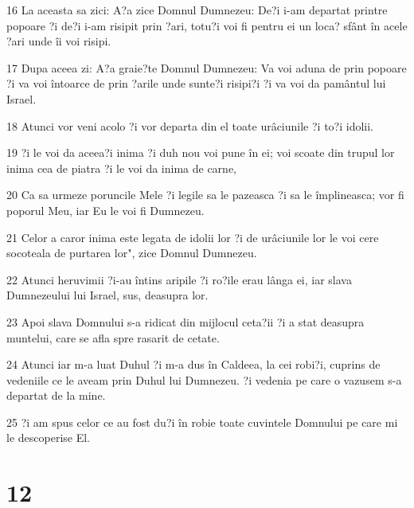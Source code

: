 \par 16 La aceasta sa zici: A?a zice Domnul Dumnezeu: De?i i-am departat printre popoare ?i de?i i-am risipit prin ?ari, totu?i voi fi pentru ei un loca? sfânt în acele ?ari unde îi voi risipi.
\par 17 Dupa aceea zi: A?a graie?te Domnul Dumnezeu: Va voi aduna de prin popoare ?i va voi întoarce de prin ?arile unde sunte?i risipi?i ?i va voi da pamântul lui Israel.
\par 18 Atunci vor veni acolo ?i vor departa din el toate urâciunile ?i to?i idolii.
\par 19 ?i le voi da aceea?i inima ?i duh nou voi pune în ei; voi scoate din trupul lor inima cea de piatra ?i le voi da inima de carne,
\par 20 Ca sa urmeze poruncile Mele ?i legile sa le pazeasca ?i sa le împlineasca; vor fi poporul Meu, iar Eu le voi fi Dumnezeu.
\par 21 Celor a caror inima este legata de idolii lor ?i de urâciunile lor le voi cere socoteala de purtarea lor", zice Domnul Dumnezeu.
\par 22 Atunci heruvimii ?i-au întins aripile ?i ro?ile erau lânga ei, iar slava Dumnezeului lui Israel, sus, deasupra lor.
\par 23 Apoi slava Domnului s-a ridicat din mijlocul ceta?ii ?i a stat deasupra muntelui, care se afla spre rasarit de cetate.
\par 24 Atunci iar m-a luat Duhul ?i m-a dus în Caldeea, la cei robi?i, cuprins de vedeniile ce le aveam prin Duhul lui Dumnezeu. ?i vedenia pe care o vazusem s-a departat de la mine.
\par 25 ?i am spus celor ce au fost du?i în robie toate cuvintele Domnului pe care mi le descoperise El.

\chapter{12}

